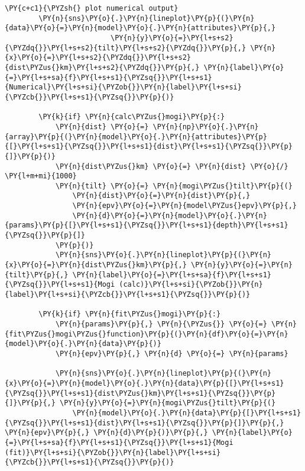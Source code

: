 \begin{tcolorbox}[breakable, size=fbox, boxrule=1pt, pad at break*=1mm,colback=cellbackground, colframe=cellborder]
\begin{Verbatim}[commandchars=\\\{\}]
        \PY{c+c1}{\PYZsh{} plot numerical output}
        \PY{n}{sns}\PY{o}{.}\PY{n}{lineplot}\PY{p}{(}\PY{n}{data}\PY{o}{=}\PY{n}{model}\PY{o}{.}\PY{n}{attributes}\PY{p}{,}
                         \PY{n}{y}\PY{o}{=}\PY{l+s+s2}{\PYZdq{}}\PY{l+s+s2}{tilt}\PY{l+s+s2}{\PYZdq{}}\PY{p}{,} \PY{n}{x}\PY{o}{=}\PY{l+s+s2}{\PYZdq{}}\PY{l+s+s2}{dist\PYZus{}km}\PY{l+s+s2}{\PYZdq{}}\PY{p}{,} \PY{n}{label}\PY{o}{=}\PY{l+s+sa}{f}\PY{l+s+s1}{\PYZsq{}}\PY{l+s+s1}{Numerical}\PY{l+s+si}{\PYZob{}}\PY{n}{label}\PY{l+s+si}{\PYZcb{}}\PY{l+s+s1}{\PYZsq{}}\PY{p}{)}

        \PY{k}{if} \PY{n}{calc\PYZus{}mogi}\PY{p}{:}
            \PY{n}{dist} \PY{o}{=} \PY{n}{np}\PY{o}{.}\PY{n}{array}\PY{p}{(}\PY{n}{model}\PY{o}{.}\PY{n}{attributes}\PY{p}{[}\PY{l+s+s1}{\PYZsq{}}\PY{l+s+s1}{dist}\PY{l+s+s1}{\PYZsq{}}\PY{p}{]}\PY{p}{)}
            \PY{n}{dist\PYZus{}km} \PY{o}{=} \PY{n}{dist} \PY{o}{/} \PY{l+m+mi}{1000}
            \PY{n}{tilt} \PY{o}{=} \PY{n}{mogi\PYZus{}tilt}\PY{p}{(}
                \PY{n}{dist}\PY{o}{=}\PY{n}{dist}\PY{p}{,}
                \PY{n}{epv}\PY{o}{=}\PY{n}{model\PYZus{}epv}\PY{p}{,}
                \PY{n}{d}\PY{o}{=}\PY{n}{model}\PY{o}{.}\PY{n}{params}\PY{p}{[}\PY{l+s+s1}{\PYZsq{}}\PY{l+s+s1}{depth}\PY{l+s+s1}{\PYZsq{}}\PY{p}{]}
            \PY{p}{)}
            \PY{n}{sns}\PY{o}{.}\PY{n}{lineplot}\PY{p}{(}\PY{n}{x}\PY{o}{=}\PY{n}{dist\PYZus{}km}\PY{p}{,} \PY{n}{y}\PY{o}{=}\PY{n}{tilt}\PY{p}{,} \PY{n}{label}\PY{o}{=}\PY{l+s+sa}{f}\PY{l+s+s1}{\PYZsq{}}\PY{l+s+s1}{Mogi (calc)}\PY{l+s+si}{\PYZob{}}\PY{n}{label}\PY{l+s+si}{\PYZcb{}}\PY{l+s+s1}{\PYZsq{}}\PY{p}{)}

        \PY{k}{if} \PY{n}{fit\PYZus{}mogi}\PY{p}{:}
            \PY{n}{params}\PY{p}{,} \PY{n}{\PYZus{}} \PY{o}{=} \PY{n}{fit\PYZus{}mogi\PYZus{}function}\PY{p}{(}\PY{n}{df}\PY{o}{=}\PY{n}{model}\PY{o}{.}\PY{n}{data}\PY{p}{)}
            \PY{n}{epv}\PY{p}{,} \PY{n}{d} \PY{o}{=} \PY{n}{params}

            \PY{n}{sns}\PY{o}{.}\PY{n}{lineplot}\PY{p}{(}\PY{n}{x}\PY{o}{=}\PY{n}{model}\PY{o}{.}\PY{n}{data}\PY{p}{[}\PY{l+s+s1}{\PYZsq{}}\PY{l+s+s1}{dist\PYZus{}km}\PY{l+s+s1}{\PYZsq{}}\PY{p}{]}\PY{p}{,} \PY{n}{y}\PY{o}{=}\PY{n}{mogi\PYZus{}tilt}\PY{p}{(}
                \PY{n}{model}\PY{o}{.}\PY{n}{data}\PY{p}{[}\PY{l+s+s1}{\PYZsq{}}\PY{l+s+s1}{dist}\PY{l+s+s1}{\PYZsq{}}\PY{p}{]}\PY{p}{,} \PY{n}{epv}\PY{p}{,} \PY{n}{d}\PY{p}{)}\PY{p}{,} \PY{n}{label}\PY{o}{=}\PY{l+s+sa}{f}\PY{l+s+s1}{\PYZsq{}}\PY{l+s+s1}{Mogi (fit)}\PY{l+s+si}{\PYZob{}}\PY{n}{label}\PY{l+s+si}{\PYZcb{}}\PY{l+s+s1}{\PYZsq{}}\PY{p}{)}
            

\end{Verbatim}
\end{tcolorbox}
